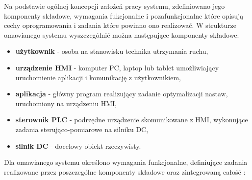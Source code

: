 \indent Na podstawie ogólnej koncepcji założeń  pracy systemu, zdefiniowano jego komponenty składowe, wymagania fukcjonalne i pozafunkcjonalne które opisują cechy oprogramowania i zadania które powinno ono realizować. \newline
\indent W strukturze omawianego systemu wyszczególnić można następujące komponenty składowe:
\begin{itemize}
\item \textbf{użytkownik} - osoba na stanowisku technika utrzymania ruchu,
\item \textbf{urządzenie HMI} - komputer PC, laptop lub tablet umożliwiający uruchomienie aplikacji i komunikację z użytkownikiem,
\item \textbf{aplikacja} - główny program realizujący zadanie optymalizacji nastaw, uruchomiony na urządzeniu HMI,
\item \textbf{sterownik PLC} - podrzędne urządzenie skomunikowane z HMI, wykonujące zadania sterująco-pomiarowe na silniku DC,
\item \textbf{silnik DC} - docelowy obiekt rzeczywisty.
\end{itemize}

\vspace{0.4cm}
\indent Dla omawianego systemu określono wymagania funkcjonalne, definiujące zadania realizowane przez poszczególne komponenty składowe oraz zintegrowaną całość :


